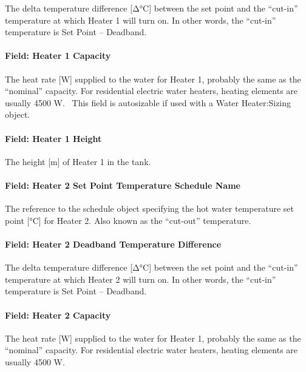 The delta temperature difference {[}Δ°C{]} between the set point and the ``cut-in'' temperature at which Heater 1 will turn on. In other words, the ``cut-in'' temperature is Set Point -- Deadband.

\paragraph{Field: Heater 1 Capacity}\label{field-heater-1-capacity}

The heat rate {[}W{]} supplied to the water for Heater 1, probably the same as the ``nominal'' capacity. For residential electric water heaters, heating elements are usually 4500 W.~ This field is autosizable if used with a Water Heater:Sizing object.

\paragraph{Field: Heater 1 Height}\label{field-heater-1-height}

The height {[}m{]} of Heater 1 in the tank.

\paragraph{Field: Heater 2 Set Point Temperature Schedule Name}\label{field-heater-2-set-point-temperature-schedule-name}

The reference to the schedule object specifying the hot water temperature set point {[}°C{]} for Heater 2. Also known as the ``cut-out'' temperature.

\paragraph{Field: Heater 2 Deadband Temperature Difference}\label{field-heater-2-deadband-temperature-difference}

The delta temperature difference {[}Δ°C{]} between the set point and the ``cut-in'' temperature at which Heater 2 will turn on. In other words, the ``cut-in'' temperature is Set Point -- Deadband.

\paragraph{Field: Heater 2 Capacity}\label{field-heater-2-capacity}

The heat rate {[}W{]} supplied to the water for Heater 1, probably the same as the ``nominal'' capacity. For residential electric water heaters, heating elements are usually 4500 W.

